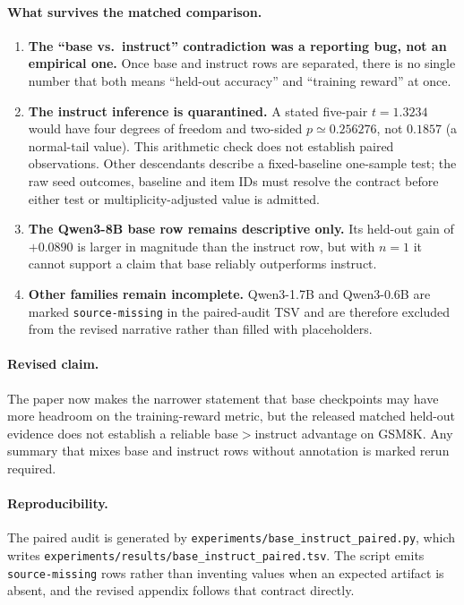 \paragraph{What survives the matched comparison.}
\begin{enumerate}
  \item \textbf{The ``base vs.\ instruct'' contradiction was a reporting bug,
        not an empirical one.} Once base and instruct rows are separated,
        there is no single number that both means ``held-out accuracy'' and
        ``training reward'' at once.
  \item \textbf{The instruct inference is quarantined.}
        A stated five-pair $t=1.3234$ would have four degrees of freedom and
        two-sided $p\simeq0.256276$, not $0.1857$ (a normal-tail value).
        This arithmetic check does not establish paired observations.
        Other descendants describe a fixed-baseline one-sample test; the
        raw seed outcomes, baseline and item IDs must resolve the contract
        before either test or multiplicity-adjusted value is admitted.
  \item \textbf{The Qwen3-8B base row remains descriptive only.} Its
        held-out gain of $+0.0890$ is larger in magnitude than the instruct
        row, but with $n=1$ it cannot support a claim that base reliably
        outperforms instruct.
  \item \textbf{Other families remain incomplete.} Qwen3-1.7B and Qwen3-0.6B
        are marked \texttt{source-missing} in the paired-audit TSV and are
        therefore excluded from the revised narrative rather than filled with
        placeholders.
\end{enumerate}

\paragraph{Revised claim.}
The paper now makes the narrower statement that base checkpoints may have
more headroom on the training-reward metric, but the released matched
held-out evidence does not establish a reliable base$>$instruct advantage on
GSM8K. Any summary that mixes base and instruct rows without annotation is
marked rerun required.

\paragraph{Reproducibility.}
The paired audit is generated by
\texttt{experiments/base\_instruct\_paired.py}, which writes
\texttt{experiments/results/base\_instruct\_paired.tsv}. The script emits
\texttt{source-missing} rows rather than inventing values when an expected
artifact is absent, and the revised appendix follows that contract directly.
